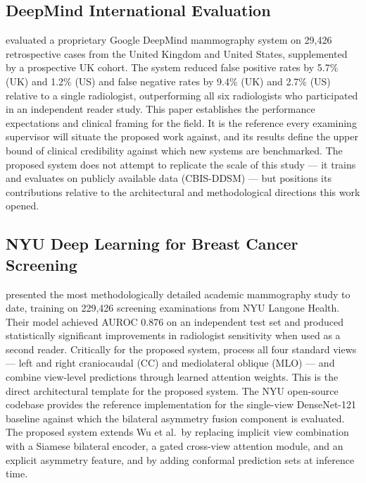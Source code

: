 \documentclass[12pt, a4paper]{article}
\begin{document}
\subsection{DeepMind International Evaluation}

\textcite{McKinney2020} evaluated a proprietary Google DeepMind mammography
system on 29,426 retrospective cases from the United Kingdom and United
States, supplemented by a prospective UK cohort.
The system reduced false positive rates by 5.7\% (UK) and 1.2\% (US) and
false negative rates by 9.4\% (UK) and 2.7\% (US) relative to a single
radiologist, outperforming all six radiologists who participated in an
independent reader study.
This paper establishes the performance expectations and clinical framing
for the field.
It is the reference every examining supervisor will situate the proposed
work against, and its results define the upper bound of clinical credibility
against which new systems are benchmarked.
The proposed system does not attempt to replicate the scale of this study
--- it trains and evaluates on publicly available data (CBIS-DDSM) --- but
positions its contributions relative to the architectural and methodological
directions this work opened.

\subsection{NYU Deep Learning for Breast Cancer Screening}

\textcite{Wu2019} presented the most methodologically detailed academic
mammography study to date, training on 229,426 screening examinations from
NYU Langone Health.
Their model achieved AUROC 0.876 on an independent test set and produced
statistically significant improvements in radiologist sensitivity when used
as a second reader.
Critically for the proposed system, \textcite{Wu2019} process all four
standard views --- left and right craniocaudal (CC) and mediolateral
oblique (MLO) --- and combine view-level predictions through learned
attention weights.
This is the direct architectural template for the proposed system.
The NYU open-source codebase provides the reference implementation for the
single-view DenseNet-121 baseline against which the bilateral asymmetry
fusion component is evaluated.
The proposed system extends Wu et al.\ by replacing implicit view
combination with a Siamese bilateral encoder, a gated cross-view attention
module, and an explicit asymmetry feature, and by adding conformal
prediction sets at inference time.
\end{document}
